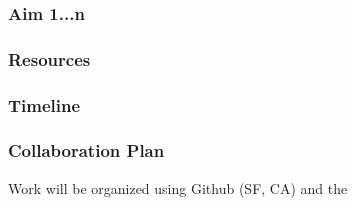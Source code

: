 \documentclass[11pt]{article}
\begin{document}
		\subsubsection{Aim 1...n}

		\subsubsection{Resources}

		\subsubsection{Timeline}

		\subsubsection{Collaboration Plan}
		Work will be organized using Github (SF, CA) and the 
\newpage

% 
% 
% 
\end{document}
